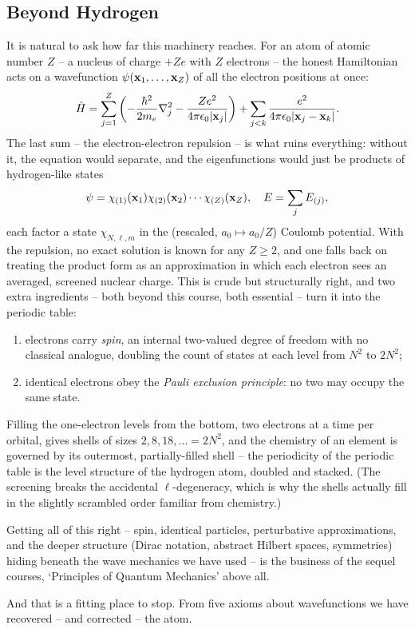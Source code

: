 \documentclass[a4paper]{scrartcl}
\begin{document}
\subsection{Beyond Hydrogen}

It is natural to ask how far this machinery reaches. For an atom of atomic number $Z$ -- a nucleus of charge $+Ze$ with $Z$ electrons -- the honest Hamiltonian acts on a wavefunction $\psi(\mathbf{x}_1, \dots, \mathbf{x}_Z)$ of all the electron positions at once:
$$
\hat{H} = \sum_{j=1}^{Z} \left( -\frac{\hbar^2}{2m_e}\nabla_j^2 - \frac{Z e^2}{4 \pi \epsilon_0 \lvert\mathbf{x}_j\rvert} \right) + \sum_{j < k} \frac{e^2}{4\pi\epsilon_0 \lvert\mathbf{x}_j - \mathbf{x}_k\rvert}.
$$
The last sum -- the electron-electron repulsion -- is what ruins everything: without it, the equation would separate, and the eigenfunctions would just be products of hydrogen-like states
$$
\psi = \chi_{(1)}(\mathbf{x}_1) \chi_{(2)}(\mathbf{x}_2) \cdots \chi_{(Z)}(\mathbf{x}_Z), \quad E = \sum_j E_{(j)},
$$
each factor a state $\chi_{N, \ell, m}$ in the (rescaled, $a_0 \mapsto a_0/Z$) Coulomb potential. With the repulsion, no exact solution is known for any $Z \geq 2$, and one falls back on treating the product form as an approximation in which each electron sees an averaged, screened nuclear charge. This is crude but structurally right, and two extra ingredients -- both beyond this course, both essential -- turn it into the periodic table:
\begin{enumerate}[label=(\roman*)]
    \item electrons carry \emph{spin}, an internal two-valued degree of freedom with no classical analogue, doubling the count of states at each level from $N^2$ to $2N^2$;
    \item identical electrons obey the \emph{Pauli exclusion principle}: no two may occupy the same state.
\end{enumerate}
Filling the one-electron levels from the bottom, two electrons at a time per orbital, gives shells of sizes $2, 8, 18, \dots = 2N^2$, and the chemistry of an element is governed by its outermost, partially-filled shell -- the periodicity of the periodic table is the level structure of the hydrogen atom, doubled and stacked. (The screening breaks the accidental $\ell$-degeneracy, which is why the shells actually fill in the slightly scrambled order familiar from chemistry.)

Getting all of this right -- spin, identical particles, perturbative approximations, and the deeper structure (Dirac notation, abstract Hilbert spaces, symmetries) hiding beneath the wave mechanics we have used -- is the business of the sequel courses, `Principles of Quantum Mechanics' above all.

And that is a fitting place to stop. From five axioms about wavefunctions we have recovered -- and corrected -- the atom.
\end{document}
